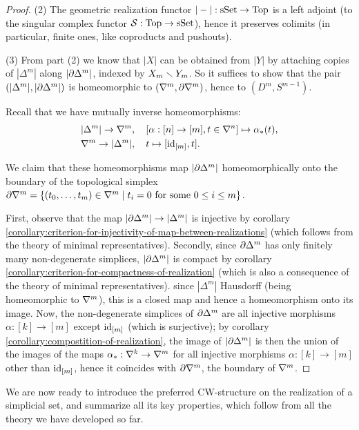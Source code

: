 \begin{proof}
(2) The geometric realization functor $|-|:{\mathrm{sSet}}\to{\mathrm{Top}}$ is a left adjoint (to the singular complex functor $\mathcal{S}:{\mathrm{Top}}\to{\mathrm{sSet}}$), hence it preserves colimits (in particular, finite ones, like coproducts and pushouts).

(3) From part (2) we know that $|X|$ can be obtained from $|Y|$ by attaching copies of $|\Delta^m|$ along $|\partial\Delta^m|$, indexed by $X_m\smallsetminus Y_m$. So it suffices to show that the pair $(|\Delta^m|,|\partial\Delta^m|)$ is homeomorphic to $(\nabla^{m},\partial\nabla^{m})$, hence to $(D^m,S^{m-1})$.

Recall that we have mutually inverse homeomorphisms:
\begin{align*}
    |\Delta^m|\to\nabla^{m}&,\quad [\alpha:[n]\to[m],t\in\nabla^n]\mapsto\alpha_*(t),\\
    \nabla^{m}\to|\Delta^m|&,\quad t\mapsto[\operatorname{id}_{[m]},t].
\end{align*}

We claim that these homeomorphisms map $|\partial\Delta^m|$ homeomorphically onto the boundary of the topological simplex $\partial\nabla^{m}=\{({{t}_0,\dots,{t}_{m}})\in\nabla^{m}\mid t_i=0\text{ for some }0\le i\le m\}$.

First, observe that the map $|\partial\Delta^m|\to|\Delta^m|$ is injective by corollary \ref{corollary:criterion-for-injectivity-of-map-between-realizations} (which follows from the theory of minimal representatives). Secondly, since $\partial\Delta^m$ has only finitely many non-degenerate simplices, $|\partial\Delta^m|$ is compact by corollary \ref{corollary:criterion-for-compactness-of-realization} (which is also a consequence of the theory of minimal representatives). since $|\Delta^m|$ Hausdorff (being homeomorphic to $\nabla^{m}$), this is a closed map and hence a homeomorphism onto its image. Now, the non-degenerate simplices of $\partial\Delta^m$ are all injective morphisms $\alpha:[k]\to[m]$ except $\operatorname{id}_{[m]}$ (which is surjective); by corollary \ref{corollary:compostition-of-realization}, the image of $|\partial\Delta^m|$ is then the union of the images of the maps $\alpha_*:\nabla^{k}\to\nabla^{m}$ for all injective morphisms $\alpha:[k]\to[m]$ other than $\operatorname{id}_{[m]}$, hence it coincides with $\partial\nabla^{m}$, the boundary of $\nabla^{m}$.
\end{proof}

We are now ready to introduce the preferred CW-structure on the realization of a simplicial set, and summarize all its key properties, which follow from all the theory we have developed so far.


